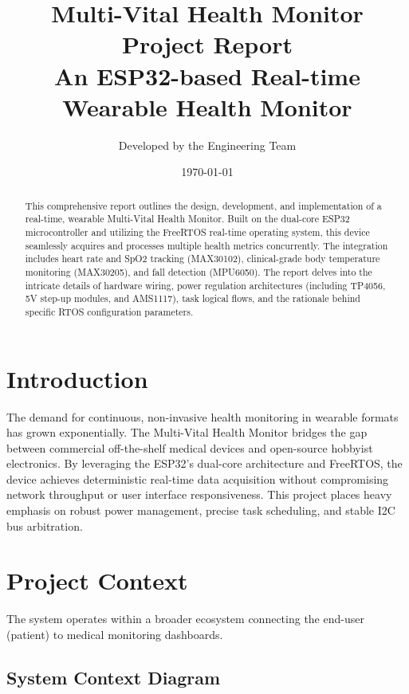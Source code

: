\documentclass[12pt,a4paper]{report}
\title{
    \vspace{2cm}
    \textbf{\Huge Multi-Vital Health Monitor Project Report}\\
    \vspace{1cm}
    \large \textbf{An ESP32-based Real-time Wearable Health Monitor}\\
    \vspace{2cm}
}
\author{Developed by the Engineering Team}
\date{\today}
\begin{document}
\maketitle

\begin{abstract}
This comprehensive report outlines the design, development, and implementation of a real-time, wearable Multi-Vital Health Monitor. Built on the dual-core ESP32 microcontroller and utilizing the FreeRTOS real-time operating system, this device seamlessly acquires and processes multiple health metrics concurrently. The integration includes heart rate and SpO2 tracking (MAX30102), clinical-grade body temperature monitoring (MAX30205), and fall detection (MPU6050). The report delves into the intricate details of hardware wiring, power regulation architectures (including TP4056, 5V step-up modules, and AMS1117), task logical flows, and the rationale behind specific RTOS configuration parameters.
\end{abstract}

\tableofcontents
\newpage

\chapter{Introduction}
The demand for continuous, non-invasive health monitoring in wearable formats has grown exponentially. The Multi-Vital Health Monitor bridges the gap between commercial off-the-shelf medical devices and open-source hobbyist electronics. By leveraging the ESP32's dual-core architecture and FreeRTOS, the device achieves deterministic real-time data acquisition without compromising network throughput or user interface responsiveness. This project places heavy emphasis on robust power management, precise task scheduling, and stable I2C bus arbitration.

\chapter{Project Context}
The system operates within a broader ecosystem connecting the end-user (patient) to medical monitoring dashboards.
\section{System Context Diagram}
\end{document}
